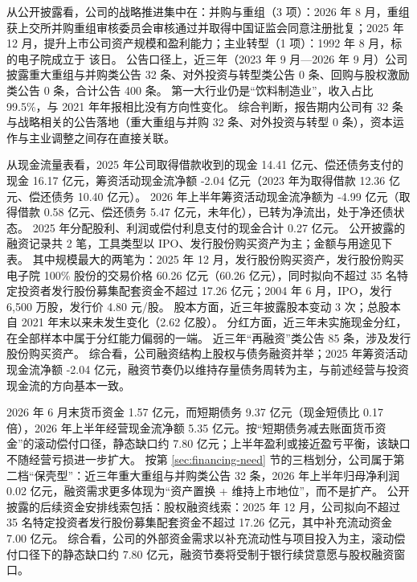  从公开披露看，公司的战略推进集中在：并购与重组（3 项）：2026 年 8 月，重组获上交所并购重组审核委员会审核通过并取得中国证监会同意注册批复；2025 年 12 月，提升上市公司资产规模和盈利能力；主业转型（1 项）：1992 年 8 月，标的电子院成立于 该日。 公告口径上，近三年（2023 年 9 月---2026 年 9 月）公司披露重大重组与并购类公告 32 条、对外投资与转型类公告 0 条、回购与股权激励类公告 0 条，合计公告 400 条。 第一大行业仍是“饮料制造业”，收入占比 99.5\%，与 2021 年年报相比没有方向性变化。 综合判断，报告期内公司有 32 条与战略相关的公告落地（重大重组与并购 32 条、对外投资与转型 0 条），资本运作与主业调整之间存在直接关联。

 从现金流量表看，2025 年公司取得借款收到的现金 14.41 亿元、偿还债务支付的现金 16.17 亿元，筹资活动现金流净额 -2.04 亿元（2023 年为取得借款 12.36 亿元、偿还债务 10.40 亿元）。 2026 年上半年筹资活动现金流净额为 -4.99 亿元（取得借款 0.58 亿元、偿还债务 5.47 亿元，未年化），已转为净流出，处于净还债状态。 2025 年分配股利、利润或偿付利息支付的现金合计 0.27 亿元。 公开披露的融资记录共 2 笔，工具类型以 IPO、发行股份购买资产为主；金额与用途见下表。 其中规模最大的两笔为：2025 年 12 月，发行股份购买资产，发行股份购买电子院 100\% 股份的交易价格 60.26 亿元（60.26 亿元），同时拟向不超过 35 名特定投资者发行股份募集配套资金不超过 17.26 亿元；2004 年 6 月，IPO，发行 6,500 万股，发行价 4.80 元/股。 股本方面，近三年披露股本变动 3 次；总股本自 2021 年末以来未发生变化（2.62 亿股）。 分红方面，近三年未实施现金分红，在全部样本中属于分红能力偏弱的一端。 近三年“再融资”类公告 85 条，涉及发行股份购买资产。 综合看，公司融资结构上股权与债务融资并举；2025 年筹资活动现金流净额 -2.04 亿元，融资节奏仍以维持存量债务周转为主，与前述经营与投资现金流的方向基本一致。

 2026 年 6 月末货币资金 1.57 亿元，而短期债务 9.37 亿元（现金短债比 0.17 倍），2026 年上半年经营现金流净额 5.35 亿元。按“短期债务减去账面货币资金”的滚动偿付口径，静态缺口约 7.80 亿元；上半年盈利或接近盈亏平衡，该缺口不随经营亏损进一步扩大。 按第 \ref{sec:financing-need} 节的三档划分，公司属于第二档“保壳型”：近三年重大重组与并购类公告 32 条，2026 年上半年归母净利润 0.02 亿元，融资需求更多体现为“资产置换 + 维持上市地位”，而不是扩产。 公开披露的后续资金安排线索包括：股权融资线索：2025 年 12 月，公司拟向不超过 35 名特定投资者发行股份募集配套资金不超过 17.26 亿元，其中补充流动资金 7.00 亿元。 综合看，公司的外部资金需求以补充流动性与项目投入为主，滚动偿付口径下的静态缺口约 7.80 亿元，融资节奏将受制于银行续贷意愿与股权融资窗口。





